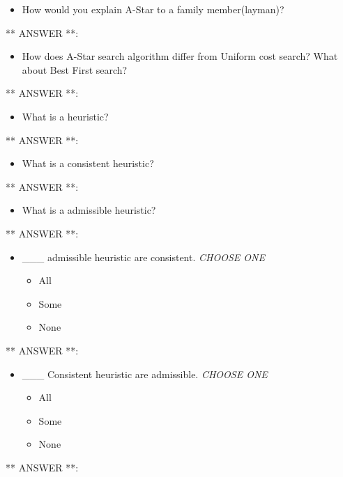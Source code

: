 \documentclass[11pt]{article}
\providecommand{\tightlist}{%
      \setlength{\itemsep}{0pt}\setlength{\parskip}{0pt}}
\begin{document}
    \begin{itemize}
\tightlist
\item
  How would you explain A-Star to a family member(layman)?
\end{itemize}

** ANSWER **:

    \begin{itemize}
\tightlist
\item
  How does A-Star search algorithm differ from Uniform cost search? What
  about Best First search?
\end{itemize}

** ANSWER **:

    \begin{itemize}
\tightlist
\item
  What is a heuristic?
\end{itemize}

** ANSWER **:

    \begin{itemize}
\tightlist
\item
  What is a consistent heuristic?
\end{itemize}

** ANSWER **:

    \begin{itemize}
\tightlist
\item
  What is a admissible heuristic?
\end{itemize}

** ANSWER **:

    \begin{itemize}
\tightlist
\item
  \_\_\_ admissible heuristic are consistent. \emph{CHOOSE ONE}

  \begin{itemize}
  \tightlist
  \item
    All
  \item
    Some
  \item
    None
  \end{itemize}
\end{itemize}

** ANSWER **:

    \begin{itemize}
\tightlist
\item
  \_\_\_ Consistent heuristic are admissible. \emph{CHOOSE ONE}

  \begin{itemize}
  \tightlist
  \item
    All
  \item
    Some
  \item
    None
  \end{itemize}
\end{itemize}

** ANSWER **:


    
    
    
    
\end{document}
